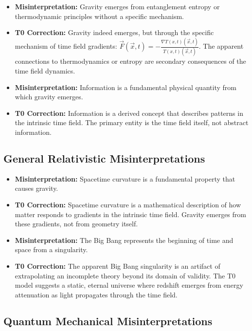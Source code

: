 \documentclass[12pt,a4paper]{article}
\newcommand{\Tfieldt}{T(x,t)}
\newcommand{\vecx}{\vec{x}}
\begin{document}
	\begin{itemize}
		\item \textbf{Misinterpretation:} Gravity emerges from entanglement entropy or thermodynamic principles without a specific mechanism.
		\item \textbf{T0 Correction:} Gravity indeed emerges, but through the specific mechanism of time field gradients: $\vec{F}(\vecx,t) = -\frac{\nabla\Tfieldt(\vecx,t)}{\Tfieldt(\vecx,t)}$. The apparent connections to thermodynamics or entropy are secondary consequences of the time field dynamics.
		
		\item \textbf{Misinterpretation:} Information is a fundamental physical quantity from which gravity emerges.
		\item \textbf{T0 Correction:} Information is a derived concept that describes patterns in the intrinsic time field. The primary entity is the time field itself, not abstract information.
	\end{itemize}
	
	\subsection{General Relativistic Misinterpretations}
	\label{subsec:gr_misinterpretations}
	
	\begin{itemize}
		\item \textbf{Misinterpretation:} Spacetime curvature is a fundamental property that causes gravity.
		\item \textbf{T0 Correction:} Spacetime curvature is a mathematical description of how matter responds to gradients in the intrinsic time field. Gravity emerges from these gradients, not from geometry itself.
		
		\item \textbf{Misinterpretation:} The Big Bang represents the beginning of time and space from a singularity.
		\item \textbf{T0 Correction:} The apparent Big Bang singularity is an artifact of extrapolating an incomplete theory beyond its domain of validity. The T0 model suggests a static, eternal universe where redshift emerges from energy attenuation as light propagates through the time field.
	\end{itemize}
	
	\subsection{Quantum Mechanical Misinterpretations}
	\label{subsec:qm_misinterpretations}
	
\end{document}
